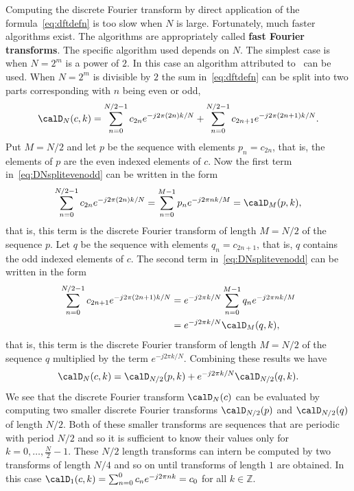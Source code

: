 \documentclass[11pt,a4paper]{book}
\theoremstyle{plain}
\numberwithin{equation}{section}
\newcommand{\ints}{{\mathbb Z}}
\newcommand{\term}{\textbf}
\begin{document}
Computing the discrete Fourier transform by direct application of the formula~\eqref{eq:dftdefn} is too slow when $N$ is large.  Fortunately, much faster algorithms exist.  The algorithms are appropriately called \term{fast Fourier transforms}.  The specific algorithm used depends on $N$.  The simplest case is when $N = 2^m$ is a power of $2$.  In this case an algorithm attributed to~\citet{Cooley_tukey_1965} can be used.  %
When $N = 2^m$ is divisible by $2$ the sum in~\eqref{eq:dftdefn} can be split into two parts corresponding with $n$ being even or odd,
\begin{equation}\label{eq:DNsplitevenodd}
\calD_N(c, k) =  \sum_{n = 0}^{N/2-1} c_{2n} e^{-j 2\pi (2n)k/N} +  \sum_{n = 0}^{N/2-1} c_{2n+1} e^{-j 2\pi (2n+1) k/N}.
\end{equation}
Put $M = N/2$ and let $p$ be the sequence with elements $p_n = c_{2n}$, that is, the elements of $p$ are the even indexed elements of $c$.  Now the first term in~\eqref{eq:DNsplitevenodd} can be written in the form
\[
\sum_{n = 0}^{N/2-1} c_{2n} e^{-j 2\pi (2n)k/N}  = \sum_{n = 0}^{M-1} p_n e^{-j 2\pi n k/M} = \calD_M(p,k),
\]
that is, this term is the discrete Fourier transform of length $M = N/2$ of the sequence $p$.  Let $q$ be the sequence with elements $q_n = c_{2n+1}$, that is, $q$ contains the odd indexed elements of $c$.  The second term in~\eqref{eq:DNsplitevenodd} can be written in the form
\begin{align*}
\sum_{n = 0}^{N/2-1} c_{2n+1} e^{-j 2\pi (2n+1) k/N} &= e^{-j 2\pi k / N} \sum_{n = 0}^{M-1} q_n e^{-j 2\pi n k/M} \\
&= e^{-j 2\pi k / N} \calD_{M}(q, k),
\end{align*}
that is, this term is the discrete Fourier transform of length $M=N/2$ of the sequence $q$ multiplied by the term $e^{-j 2\pi k / N}$.  Combining these results we have
\[
\calD_N(c,k) = \calD_{N/2}(p, k) + e^{-j 2\pi k / N} \calD_{N/2}(q, k).
\]
We see that the discrete Fourier transform $\calD_N(c)$ can be evaluated by computing two smaller discrete Fourier transforms $\calD_{N/2}(p)$ and $\calD_{N/2}(q)$ of length $N/2$.  Both of these smaller transforms are sequences that are periodic with period $N/2$ and so it is sufficient to know their values only for $k = 0,\dots,\tfrac{N}{2}-1$.  %
These $N/2$ length transforms can intern be computed by two transforms of length $N/4$ and so on until transforms of length $1$ are obtained.  In this case $\calD_{1}(c, k) = \sum_{n = 0}^{0} c_n e^{-j 2\pi n k } = c_0$  for all $k \in \ints$.  
\end{document}
